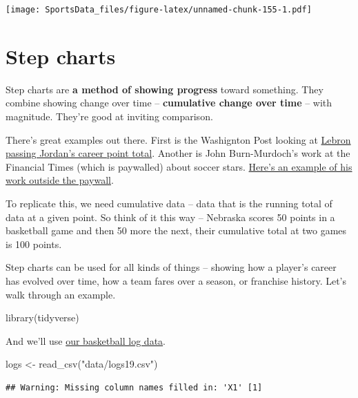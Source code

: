 \documentclass[
]{book}
\newenvironment{Shaded}{\begin{snugshade}}{\end{snugshade}}
\newcommand{\FunctionTok}[1]{\textcolor[rgb]{0.00,0.00,0.00}{#1}}
\newcommand{\NormalTok}[1]{#1}
\newcommand{\OtherTok}[1]{\textcolor[rgb]{0.56,0.35,0.01}{#1}}
\newcommand{\StringTok}[1]{\textcolor[rgb]{0.31,0.60,0.02}{#1}}
\begin{document}
\texttt{[image: SportsData\_files/figure-latex/unnamed-chunk-155-1.pdf]}

\hypertarget{step-charts}{%
\chapter{Step charts}\label{step-charts}}

Step charts are \textbf{a method of showing progress} toward something. They combine showing change over time -- \textbf{cumulative change over time} -- with magnitude. They're good at inviting comparison.

There's great examples out there. First is the Washignton Post looking at \href{https://www.washingtonpost.com/graphics/sports/lebron-james-michael-jordan-nba-scoring-list/?utm_term=.481074150849}{Lebron passing Jordan's career point total}. Another is John Burn-Murdoch's work at the Financial Times (which is paywalled) about soccer stars. \href{http://johnburnmurdoch.github.io/projects/goal-lines/CL/}{Here's an example of his work outside the paywall}.

To replicate this, we need cumulative data -- data that is the running total of data at a given point. So think of it this way -- Nebraska scores 50 points in a basketball game and then 50 more the next, their cumulative total at two games is 100 points.

Step charts can be used for all kinds of things -- showing how a player's career has evolved over time, how a team fares over a season, or franchise history. Let's walk through an example.

\begin{Shaded}
\begin{Highlighting}[]
\FunctionTok{library}\NormalTok{(tidyverse)}
\end{Highlighting}
\end{Shaded}

And we'll use \href{https://unl.box.com/s/a8m91bro10t89watsyo13yjegb1fy009}{our basketball log data}.

\begin{Shaded}
\begin{Highlighting}[]
\NormalTok{logs }\OtherTok{\textless{}{-}} \FunctionTok{read\_csv}\NormalTok{(}\StringTok{"data/logs19.csv"}\NormalTok{)}
\end{Highlighting}
\end{Shaded}

\begin{verbatim}
## Warning: Missing column names filled in: 'X1' [1]
\end{verbatim}
\end{document}
